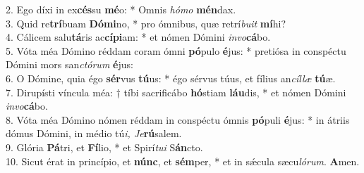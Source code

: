2. Ego díxi in ex\textbf{cés}su \textbf{mé}o: * Omnis \textit{hómo} \textbf{mén}dax.\\
3. Quid re\textbf{trí}buam \textbf{Dómi}no, * pro ómnibus, quæ retrí\textit{buit} \textbf{mí}hi?\\
4. Cálicem salu\textbf{tá}ris ac\textbf{cípi}am: * et nómen Dómini \textit{invo}\textbf{cá}bo.\\
5. Vóta méa Dómino réddam coram ómni \textbf{pó}pulo \textbf{é}jus: * pretiósa in conspéctu Dómini mors san\textit{ctórum} \textbf{é}jus:\\
6. O Dómine, quia égo \textbf{sér}vus \textbf{tú}us: * égo sérvus túus, et fílius an\textit{cíllæ} \textbf{tú}æ.\\
7. Dirupísti víncula méa: † tíbi sacrificábo \textbf{hó}stiam \textbf{láu}dis, * et nómen Dómini \textit{invo}\textbf{cá}bo.\\
8. Vóta méa Dómino nómen réddam in conspéctu ómnis \textbf{pó}puli \textbf{é}jus: * in átriis dómus Dómini, in médio tú\textit{i, Je}\textbf{rú}salem.\\
9. Glória \textbf{Pá}tri, et \textbf{Fí}lio, * et Spirí\textit{tui} S\textbf{án}cto.\\
10. Sicut érat in princípio, et \textbf{núnc}, et \textbf{sém}per, * et in sǽcula sæcu\textit{lórum}. \textbf{A}men.